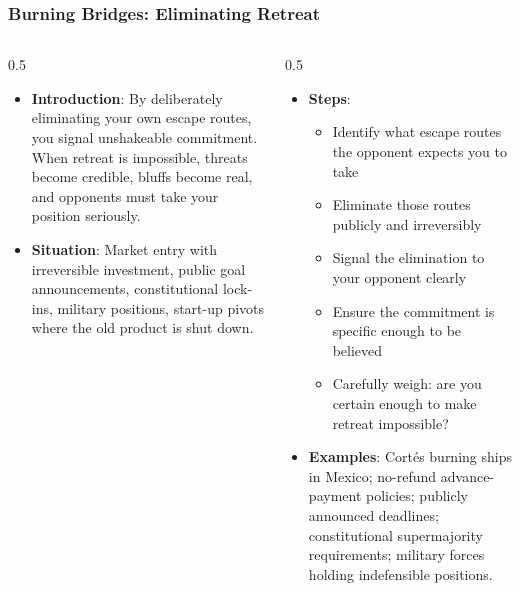 \begin{frame}[fragile]\frametitle{Burning Bridges: Eliminating Retreat}
\begin{columns}
    \begin{column}[T]{0.5\linewidth}
      \begin{itemize}
        \item \textbf{Introduction}: By deliberately eliminating your own escape routes, you signal unshakeable commitment. When retreat is impossible, threats become credible, bluffs become real, and opponents must take your position seriously.
        \item \textbf{Situation}: Market entry with irreversible investment, public goal announcements, constitutional lock-ins, military positions, start-up pivots where the old product is shut down.
      \end{itemize}
    \end{column}
    \begin{column}[T]{0.5\linewidth}
      \begin{itemize}
        \item \textbf{Steps}:
        \begin{itemize}
          \item Identify what escape routes the opponent expects you to take
          \item Eliminate those routes publicly and irreversibly
          \item Signal the elimination to your opponent clearly
          \item Ensure the commitment is specific enough to be believed
          \item Carefully weigh: are you certain enough to make retreat impossible?
        \end{itemize}\item \textbf{Examples}: Cortés burning ships in Mexico; no-refund advance-payment policies; publicly announced deadlines; constitutional supermajority requirements; military forces holding indefensible positions.
      \end{itemize}
    \end{column}
  \end{columns}
\end{frame}

